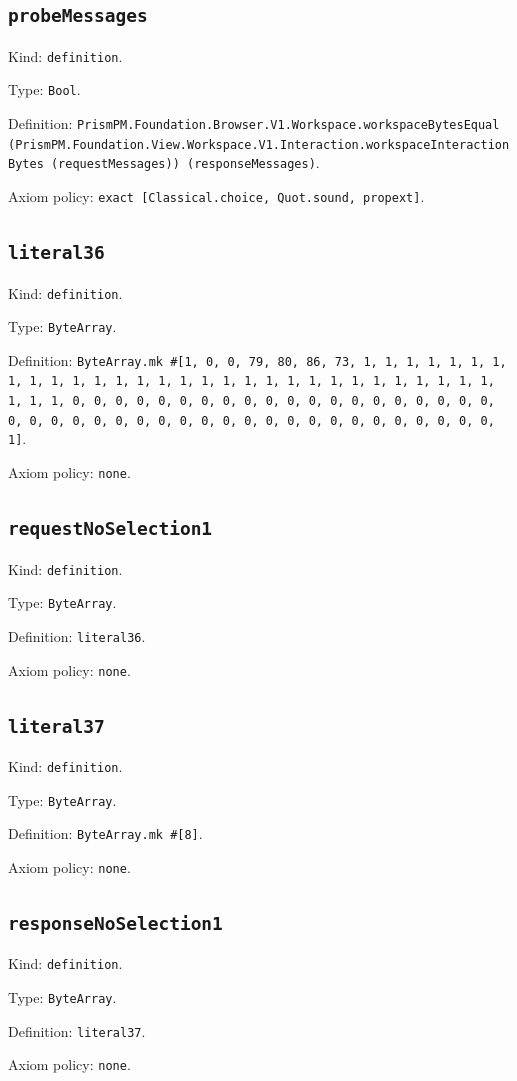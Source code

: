 \documentclass[11pt]{article}
\begin{document}
\subsection*{\texttt{probeMessages}}
\noindent Kind: \texttt{definition}.\par
\noindent Type: \texttt{Bool}.\par
\noindent Definition: \texttt{PrismPM.Foundation.Browser.V1.Workspace.workspaceBytesEqual (PrismPM.Foundation.View.Workspace.V1.Interaction.workspaceInteractionBytes (requestMessages)) (responseMessages)}.\par
\noindent Axiom policy: \texttt{exact [Classical.choice, Quot.sound, propext]}.\par
\subsection*{\texttt{literal36}}
\noindent Kind: \texttt{definition}.\par
\noindent Type: \texttt{ByteArray}.\par
\noindent Definition: \texttt{ByteArray.mk \#[1, 0, 0, 79, 80, 86, 73, 1, 1, 1, 1, 1, 1, 1, 1, 1, 1, 1, 1, 1, 1, 1, 1, 1, 1, 1, 1, 1, 1, 1, 1, 1, 1, 1, 1, 1, 1, 1, 1, 1, 0, 0, 0, 0, 0, 0, 0, 0, 0, 0, 0, 0, 0, 0, 0, 0, 0, 0, 0, 0, 0, 0, 0, 0, 0, 0, 0, 0, 0, 0, 0, 0, 0, 0, 0, 0, 0, 0, 0, 0, 0, 0, 0, 1]}.\par
\noindent Axiom policy: \texttt{none}.\par
\subsection*{\texttt{requestNoSelection1}}
\noindent Kind: \texttt{definition}.\par
\noindent Type: \texttt{ByteArray}.\par
\noindent Definition: \texttt{literal36}.\par
\noindent Axiom policy: \texttt{none}.\par
\subsection*{\texttt{literal37}}
\noindent Kind: \texttt{definition}.\par
\noindent Type: \texttt{ByteArray}.\par
\noindent Definition: \texttt{ByteArray.mk \#[8]}.\par
\noindent Axiom policy: \texttt{none}.\par
\subsection*{\texttt{responseNoSelection1}}
\noindent Kind: \texttt{definition}.\par
\noindent Type: \texttt{ByteArray}.\par
\noindent Definition: \texttt{literal37}.\par
\noindent Axiom policy: \texttt{none}.\par
\end{document}
